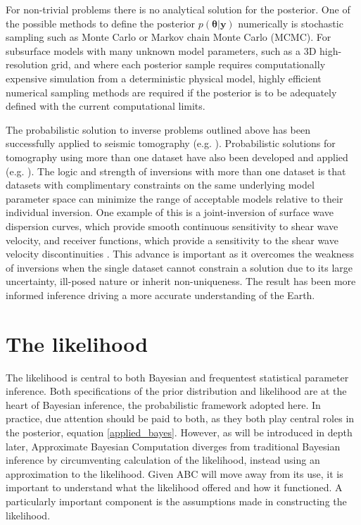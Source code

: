 For non-trivial problems there is no analytical solution for the posterior. One of the possible methods to define the posterior $p(\bm{\theta}|\bm{y})$ numerically is stochastic sampling such as Monte Carlo or Markov chain Monte Carlo (MCMC). For subsurface models with many unknown model parameters, such as a 3D high-resolution grid, and where each posterior sample requires computationally expensive simulation from a deterministic physical model, highly efficient numerical sampling methods are required if the posterior is to be adequately defined with the current computational limits. \par

The probabilistic solution to inverse problems outlined above has been successfully applied to seismic tomography (e.g. \citet{Zhao1996,Sambridge1999,Shapiro2002,Trampert2004,Khan2011}). Probabilistic solutions for tomography using more than one dataset have also been developed  and applied (e.g. \citet{khan2007joint,Moorkamp2010,Bodin2012,Shen2012,afonso2013a,afonso2013b,afonso2016}). The logic and strength of inversions with more than one dataset is that datasets with complimentary constraints on the same underlying model parameter space can minimize the range of acceptable models relative to their individual inversion. One example of this is a joint-inversion of surface wave dispersion curves, which  provide smooth continuous sensitivity to shear wave velocity, and receiver functions, which provide a sensitivity to the shear wave velocity discontinuities \citep{Bodin2012}. This advance is important as it overcomes the weakness of inversions when the single dataset cannot constrain a solution due to its large uncertainty, ill-posed nature or inherit non-uniqueness. The result has been more informed inference driving a more accurate understanding of the Earth.

\section{The likelihood}

The likelihood is central to both Bayesian and frequentest statistical parameter inference. Both specifications of the prior distribution and likelihood are at the heart of Bayesian inference, the probabilistic framework adopted here. In practice, due attention should be paid to both, as they both play central roles in the posterior, equation \ref{applied_bayes}. However, as will be introduced in depth later, Approximate Bayesian Computation diverges from traditional Bayesian inference by circumventing calculation of the likelihood, instead using an approximation to the likelihood. Given ABC will move away from its use, it is important to understand what the likelihood offered and how it functioned. A particularly important component is the assumptions made in constructing the likelihood. \par

